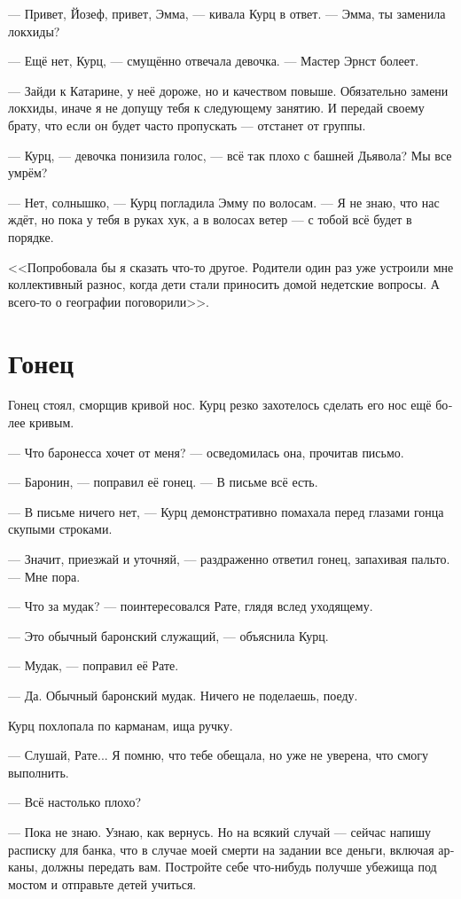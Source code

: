 \documentclass[a4paper,12pt,fleqn]{book}\usepackage{cooltooltips}\usepackage{polyglossia}\setdefaultlanguage[babelshorthands=true]{russian}\setotherlanguage{english}\defaultfontfeatures{Ligatures=TeX,Mapping=tex-text} \usepackage{xcolor}\definecolor{lightgray}{HTML}{bbbbbb}\color{lightgray}\newcommand{\ml}[3]{\textenglish{\textcolor{black}{#3}}}
\begin{document}
--- Привет, Йозеф, привет, Эмма, --- кивала Курц в ответ.
--- Эмма, ты заменила локхиды?

--- Ещё нет, Курц, --- смущённо отвечала девочка.
--- Мастер Эрнст болеет.

--- Зайди к Катарине, у неё дороже, но и качеством повыше.
Обязательно замени локхиды, иначе я не допущу тебя к следующему занятию.
И передай своему брату, что если он будет часто пропускать --- отстанет от группы.

--- Курц, --- девочка понизила голос, --- всё так плохо с башней Дьявола?
Мы все умрём?

--- Нет, солнышко, --- Курц погладила Эмму по волосам.
--- Я не знаю, что нас ждёт, но пока у тебя в руках хук, а в волосах ветер --- с тобой всё будет в порядке.

<<Попробовала бы я сказать что-то другое.
Родители один раз уже устроили мне коллективный разнос, когда дети стали приносить домой недетские вопросы.
А всего-то о географии поговорили>>.

\section{Гонец}

Гонец стоял, сморщив кривой нос.
Курц резко захотелось сделать его нос ещё более кривым.

--- Что баронесса хочет от меня? --- осведомилась она, прочитав письмо.

--- Баронин, --- поправил её гонец.
--- В письме всё есть.

--- В письме ничего нет, --- Курц демонстративно помахала перед глазами гонца скупыми строками.

--- Значит, приезжай и уточняй, --- раздраженно ответил гонец, запахивая пальто.
--- Мне пора.

--- Что за мудак? --- поинтересовался Рате, глядя вслед уходящему.

--- Это обычный баронский служащий, --- объяснила Курц.

--- Мудак, --- поправил её Рате.

--- Да.
Обычный баронский мудак.
Ничего не поделаешь, поеду.

Курц похлопала по карманам, ища ручку.

--- Слушай, Рате...
Я помню, что тебе обещала, но уже не уверена, что смогу выполнить.

--- Всё настолько плохо?

--- Пока не знаю.
Узнаю, как вернусь.
Но на всякий случай --- сейчас напишу расписку для банка, что в случае моей смерти на задании все деньги, включая арканы, должны передать вам.
Постройте себе что-нибудь получше убежища под мостом и отправьте детей учиться.
\end{document}
